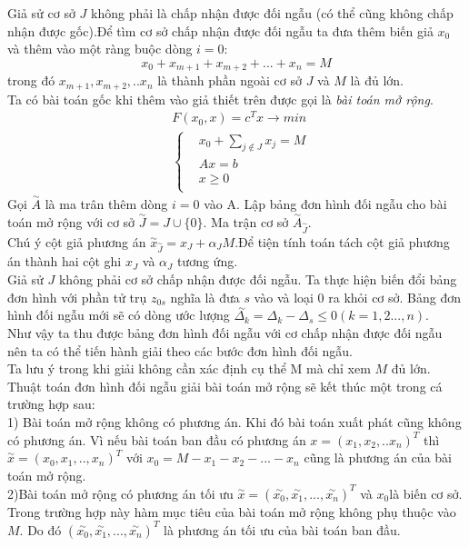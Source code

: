 \documentclass[12pt,a4paper]{report}
\begin{document}
\begin{itemize}
    Giả sử cơ sở $J$ không phải là chấp nhận được đối ngẫu (có thể cũng không chấp nhận được gốc).Để tìm cơ sở chấp nhận được đối ngẫu ta đưa thêm biến giả $x_0$ và thêm vào một ràng buộc dòng $i=0$:\\
    $$x_0+x_{m+1}+x_{m+2}+...+x_n=M$$
    trong đó $x_{m+1},x_{m+2},..x_n$ là thành phần ngoài cơ sở $J$ và $M$ là đủ lớn.\\
    Ta có bài toán gốc khi thêm vào giả thiết trên được gọi là \textit{bài toán mở rộng}.\\
    \begin{equation*}
        \begin{split}
            &F(x_0,x)=c^Tx \longrightarrow min\\
            &\left\{\begin{split}
                & x_0 + \sum_{j \notin J} x_j=M\\
                &Ax=b\\
                & x \ge 0\\
            \end{split}\right.
        \end{split}
    \end{equation*}
     Gọi $\overset{\sim}{A}$ là ma trân thêm dòng $i=0$ vào A. Lập bảng đơn hình đối ngẫu cho bài toán mở rộng với cơ sở $\overset{\sim}{J}=J \cup \{0\}$. Ma trận cơ sở $\overset{\sim}{A}_{\overset{\sim}{J}}$.\\
Chú ý cột giả phương án $\overset{\sim}{x}_{\overset{\sim}{J}}=x_J+\alpha_JM.$Để tiện tính toán tách cột giả phương án thành hai cột ghi $x_J$ và $\alpha_J$ tương ứng.\\
Giả sử $J$ không phải cơ sở chấp nhận được đối ngẫu. Ta thực hiện biến đổi bảng đơn hình với phần tử trụ $z_{0s}$ nghĩa là đưa $s$ vào và loại $0$ ra khỏi cơ sở. Bảng đơn hình đối ngẫu mới sẽ có dòng ước lượng $\overset{\sim}{\Delta_k}=\Delta_k- \Delta_s\le 0  (k=1,2...,n)$.\\
Như vậy ta thu được bảng đơn hình đối ngẫu với cơ  chấp nhận được đối ngẫu nên ta có thể tiến hành giải theo các bước đơn hình đối ngẫu.\\
Ta lưu ý trong khi giải không cần xác định cụ thể M mà chỉ xem $M$ đủ lớn.\\
Thuật toán đơn hình đối ngẫu giải bài toán mở rộng sẽ kết thúc một trong cá trường hợp sau:\\
    1) Bài toán mở rộng không có phương án. Khi đó bài toán xuất phát cũng không có phương án. Vì nếu bài toán ban đầu có phương án $x=(x_1,x_2,..x_n)^T$ thì $\overset{\sim}{x}=(x_0,x_1,..,x_n)^T$ với $x_0=M-x_1-x_2-...-x_n$ cũng là phương án của bài toán mở rộng.\\
    2)Bài toán mở rộng có phương án tối ưu $\overset{\sim}{x}=(\overset{\sim}{x_0},\overset{\sim}{x_1},...,\overset{\sim}{x_n})^T$ và $x_0$là biến cơ sở. Trong trường hợp này hàm mục tiêu của bài toán mở rộng không phụ thuộc vào $M$. Do đó $(\overset{\sim}{x_0},\overset{\sim}{x_1},...,\overset{\sim}{x_n})^T$ là phương án tối ưu của bài toán ban đầu.\\


\end{itemize}
\end{document}
